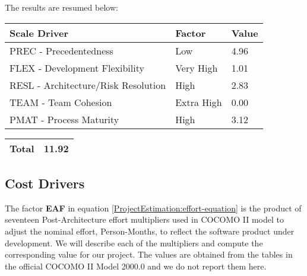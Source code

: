 \documentclass[\mainpath/main]{subfiles}
\begin{document}
The results are resumed below:
\begin{table}[h]
	\begin{tabular}{|L{7.5cm}|C{2.5cm}|C{2cm}|}
		\hline \textbf{Scale Driver} & \textbf{Factor} & \textbf{Value} \\
		\hline PREC - Precedentedness & Low & 4.96 \\
		\hline FLEX - Development Flexibility & Very High & 1.01 \\
		\hline RESL - Architecture/Risk Resolution & High & 2.83 \\
		\hline TEAM - Team Cohesion & Extra High & 0.00 \\
		\hline PMAT - Process Maturity & High & 3.12 \\
		\hline 
	\end{tabular} 
	\begin{tabular}{|L{10.43cm}|C{2cm}|}
		\hline \textbf{Total} & \textbf{11.92} \\
		\hline
	\end{tabular}
\end{table}


\subsection{Cost Drivers}
The factor \textbf{EAF} in equation \ref{ProjectEstimation:effort-equation} is the product of seventeen Post-Architecture effort multipliers used in COCOMO II model to adjust the nominal effort, Person-Months, to reflect the software product under
development. We will describe each of the multipliers and compute the corresponding value for our project. The values are obtained from the tables in the official COCOMO II Model 2000.0 and we do not report them here.  
\end{document}
